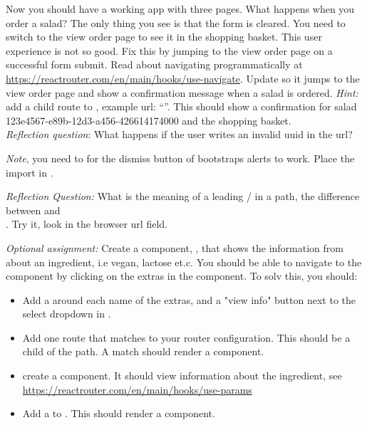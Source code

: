 \documentclass[fleqn, article, a4paper]{memoir}
\begin{document}
\begin{Assignments}
\item Now you should have a working app with three pages. What happens when you order a salad? The only thing you see is that the form is cleared. You need to switch to the view order page to see it in the shopping basket. This user experience is not so good. Fix this by jumping to the view order page on a successful form submit. Read about navigating programmatically at \url{https://reactrouter.com/en/main/hooks/use-navigate}. Update  so it jumps to the view order page and show a confirmation message when a salad is ordered. \emph{Hint:} add a child route to , example url: ``''. This should show a confirmation for salad 123e4567-e89b-12d3-a456-426614174000 and the shopping basket. 
\\\emph{Reflection question}: What happens if the user writes an invalid uuid in the url?

\emph{Note}, you need to  for the dismiss button of bootstraps alerts to work. Place the import in .

\emph{Reflection Question:} What is the meaning of a leading / in a path, the difference between  and \\ . Try it, look in the browser url field.

\item \emph{Optional assignment:} Create a component, , that shows the information from  about an ingredient, i.e vegan, lactose et.c. You should be able to navigate to the  component by clicking on the extras in the  component. To solv this, you should:
\begin{itemize}
  \item Add a  around each name of the extras, and a "view info" button next to the select dropdown in .
  \item Add one route that matches  to your router configuration. This should be a child of the  path. A match should render a  component.
  \item create a  component. It should view information about the  ingredient, see \url{https://reactrouter.com/en/main/hooks/use-params}
  \item Add a  to . This should render a  component.
\end{itemize}


\end{Assignments}
\end{document}
